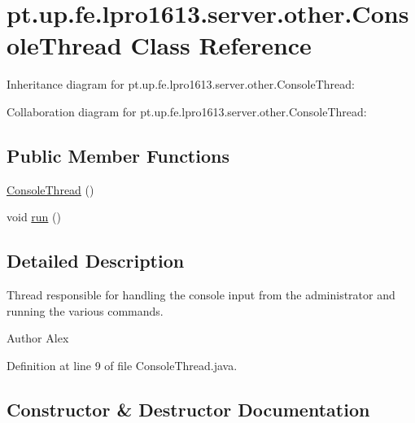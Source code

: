 \hypertarget{classpt_1_1up_1_1fe_1_1lpro1613_1_1server_1_1other_1_1_console_thread}{}\section{pt.\+up.\+fe.\+lpro1613.\+server.\+other.\+Console\+Thread Class Reference}
\label{classpt_1_1up_1_1fe_1_1lpro1613_1_1server_1_1other_1_1_console_thread}


Inheritance diagram for pt.\+up.\+fe.\+lpro1613.\+server.\+other.\+Console\+Thread\+:


Collaboration diagram for pt.\+up.\+fe.\+lpro1613.\+server.\+other.\+Console\+Thread\+:
\subsection*{Public Member Functions}
\begin{DoxyCompactItemize}
\item 
\hyperlink{classpt_1_1up_1_1fe_1_1lpro1613_1_1server_1_1other_1_1_console_thread_a952e675cf3430f7edd3c3280cceb2f0b}{Console\+Thread} ()
\item 
void \hyperlink{classpt_1_1up_1_1fe_1_1lpro1613_1_1server_1_1other_1_1_console_thread_a7740e1ce4d58dbe4cfcbf6caaa998290}{run} ()
\end{DoxyCompactItemize}


\subsection{Detailed Description}
Thread responsible for handling the console input from the administrator and running the various commands.

\begin{DoxyAuthor}{Author}
Alex 
\end{DoxyAuthor}


Definition at line 9 of file Console\+Thread.\+java.



\subsection{Constructor \& Destructor Documentation}
\hypertarget{classpt_1_1up_1_1fe_1_1lpro1613_1_1server_1_1other_1_1_console_thread_a952e675cf3430f7edd3c3280cceb2f0b}{}\label{classpt_1_1up_1_1fe_1_1lpro1613_1_1server_1_1other_1_1_console_thread_a952e675cf3430f7edd3c3280cceb2f0b} 
